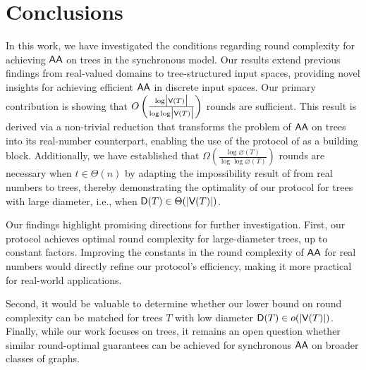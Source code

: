 \section{Conclusions}

In this work, we have investigated the conditions regarding round complexity for achieving $\textsf{AA}$ on trees in the synchronous model. Our results extend previous findings from real-valued domains to tree-structured input spaces, providing novel insights for achieving efficient $\textsf{AA}$ in discrete input spaces.
Our primary contribution is showing that $O\left( \frac{ \log \abs{ \vertices(\tree)} } {\log \log \abs{\vertices(\tree)}} \right)$ rounds are sufficient. This result is derived via a non-trivial reduction that transforms the problem of  $\textsf{AA}$ on trees into its real-number counterpart, enabling the use of the protocol of \cite{BenDoHo10} as a building block. Additionally, we have established that $\Omega\left( \frac{ \log \diameter(T)} {\log \log \diameter(T)} \right)$ rounds are necessary when $t \in \Theta(n)$
by adapting the impossibility result of \cite{Fekete90} from real numbers to trees, thereby demonstrating the optimality of our protocol for trees with large diameter, i.e., when $\textsf{D}(T) \in \Theta(|\textsf{V}(T)|)$.

Our findings highlight promising directions for further investigation.
First, our protocol achieves optimal round complexity for large-diameter trees, up to constant factors. Improving the constants in the round complexity of 
$\textsf{AA}$ for real numbers would directly refine our protocol's efficiency, making it more practical for real-world applications.

Second, it would be valuable to determine whether our lower bound on round complexity can be matched for trees $T$ with low diameter $\textsf{D}(T) \in o(|\textsf{V}(T)|)$. 
Finally, while our work focuses on trees, it remains an open question whether similar round-optimal guarantees can be achieved for synchronous $\textsf{AA}$ on broader classes of graphs.
